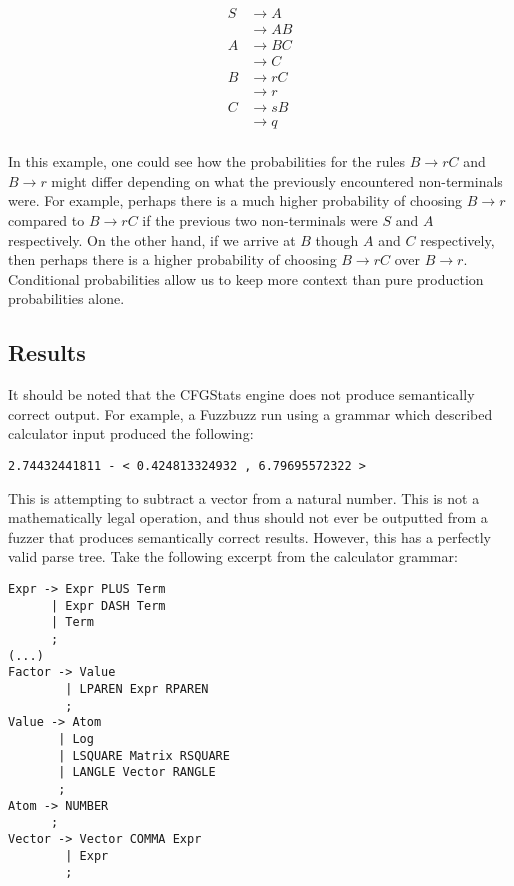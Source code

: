 \begin{align*}
S &\rightarrow A \\
&\rightarrow A B \\
A &\rightarrow B C \\
&\rightarrow C \\
B &\rightarrow r C \\
&\rightarrow r \\
C &\rightarrow s B \\
&\rightarrow q \\
\end{align*}


In this example, one could see how the probabilities for the rules $B
\rightarrow rC$ and $B \rightarrow r$ might differ depending on what the
previously encountered non-terminals were. For example, perhaps there is a much
higher probability of choosing $B \rightarrow r$ compared to $B \rightarrow rC$
if the previous two non-terminals were $S$ and $A$ respectively. On the other
hand, if we arrive at $B$ though $A$ and $C$ respectively, then perhaps there is
a higher probability of choosing $B \rightarrow rC$ over $B \rightarrow
r$. Conditional probabilities allow us to keep more context than pure production
probabilities alone.

\subsection{Results}


It should be noted that the CFGStats engine does not produce
semantically correct output. For example, a Fuzzbuzz run using a
grammar which described calculator input produced the following:

\begin{verbatim}
2.74432441811 - < 0.424813324932 , 6.79695572322 >
\end{verbatim}

This is attempting to subtract a vector from a natural number. This is not a
mathematically legal operation, and thus should not ever be outputted from a
fuzzer that produces semantically correct results. However, this has a
perfectly valid parse tree. Take the following excerpt from the calculator
grammar:

\begin{verbatim}
Expr -> Expr PLUS Term
      | Expr DASH Term
      | Term
      ;
(...)
Factor -> Value
        | LPAREN Expr RPAREN
        ;
Value -> Atom
       | Log
       | LSQUARE Matrix RSQUARE
       | LANGLE Vector RANGLE
       ;
Atom -> NUMBER
      ;
Vector -> Vector COMMA Expr
        | Expr
        ;
\end{verbatim}

